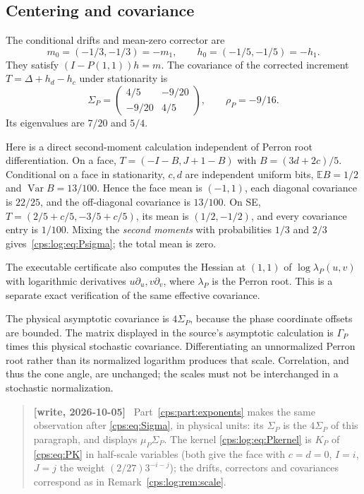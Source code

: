 \documentclass[11pt,letterpaper]{article}
\numberwithin{equation}{section}
\theoremstyle{remark}\newtheorem{remark}[theorem]{Remark}
\newcommand{\EE}{\mathbb E}
\newcommand{\Var}{\operatorname{Var}}
\newenvironment{writenotelog}{\begin{quote}\small\sloppy\textbf{[write, 2026-10-05]}\ }{\end{quote}}
\newcommand{\gp}{\Gamma_P}\newcommand{\gs}{\Gamma_S}
\begin{document}
\subsection{Centering and covariance}\label{cps:log:sec:Pcov}
The conditional drifts and mean-zero corrector are
\[
 m_0=(-1/3,-1/3)=-m_1,\qquad
 h_0=(-1/5,-1/5)=-h_1.
\]
They satisfy $(I-P(1,1))h=m$. The covariance of the corrected
increment $T=\Delta+h_d-h_c$ under stationarity is
\begin{equation}\label{cps:log:eq:Psigma}
 \Sigma_P=\begin{pmatrix}4/5&-9/20\\-9/20&4/5\end{pmatrix},
 \qquad \rho_P=-9/16.
\end{equation}
Its eigenvalues are $7/20$ and $5/4$.

Here is a direct second-moment calculation independent of Perron
root differentiation. On a face,
$T=(-I-B,J+1-B)$ with $B=(3d+2c)/5$. Conditional on a face in
stationarity, $c,d$ are independent uniform bits,
$\EE B=1/2$ and $\Var B=13/100$. Hence the face mean is $(-1,1)$,
each diagonal covariance is $22/25$, and the off-diagonal covariance
is $13/100$. On SE,
$T=(2/5+c/5,-3/5+c/5)$, its mean is $(1/2,-1/2)$, and every covariance
entry is $1/100$. Mixing the \emph{second moments} with probabilities
$1/3$ and $2/3$ gives~\eqref{cps:log:eq:Psigma}; the total mean is zero.

The executable certificate also computes the Hessian at $(1,1)$ of
$\log\lambda_P(u,v)$ with logarithmic derivatives
$u\partial_u,v\partial_v$, where $\lambda_P$ is the Perron root.
This is a separate exact verification of the same effective covariance.

The physical asymptotic covariance is $4\Sigma_P$, because the phase
coordinate offsets are bounded. The matrix displayed in the source's
asymptotic calculation is $\gp$ times this physical stochastic
covariance. Differentiating an unnormalized Perron root rather than
its normalized logarithm produces that scale. Correlation, and thus
the cone angle, are unchanged; the scales must not be interchanged in
a stochastic normalization.

\begin{writenotelog}
Part~\ref{cps:part:exponents} makes the same observation after \eqref{cps:eq:Sigma}, in physical
units: its $\Sigma_P$ is the $4\Sigma_P$ of this paragraph, and \cite[Section 4.2]{FNS} displays
$\mu_P\Sigma_P$. The kernel \eqref{cps:log:eq:Pkernel} is $K_P$ of \eqref{cps:eq:PK} in
half-scale variables (both give the face with $c=d=0$, $I=i$, $J=j$ the weight
$(2/27)3^{-i-j}$); the drifts, correctors and covariances correspond as in
Remark~\ref{cps:log:rem:scale}.
\end{writenotelog}
\end{document}
